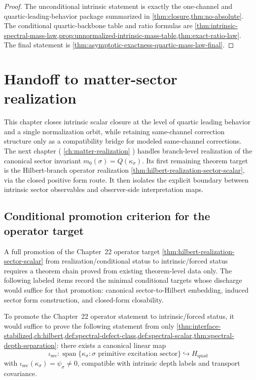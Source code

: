 \begin{proof}
The unconditional intrinsic statement is exactly the one-channel and
quartic-leading-behavior package summarized in
\cref{thm:closure,thm:no-absolute}.
The conditional quartic-backbone table and ratio formulas are
\cref{thm:intrinsic-spectral-mass-law,prop:unnormalized-intrinsic-mass-table,thm:exact-ratio-law}.
The final statement is
\cref{thm:asymptotic-exactness-quartic-mass-law-final}.
\end{proof}

\section{Handoff to matter-sector realization}
\label{sec:shell-handoff}

This chapter closes intrinsic scalar closure at the level of quartic
leading behavior and a single normalization orbit, while retaining
same-channel correction structure only as a compatibility bridge for
modeled same-channel corrections.
The next chapter (
\cref{ch:matter-realization}
) handles branch-level realization of the canonical sector invariant
\(m_0(\sigma)=Q(\kappa_\sigma)\).
Its first remaining theorem target is the Hilbert-branch operator
realization
\cref{thm:hilbert-realization-sector-scalar}, via the closed positive
form route.
It then isolates the explicit boundary between intrinsic sector observables
and observer-side interpretation maps.


\subsection{Conditional promotion criterion for the operator target}
\label{subsec:shell-operator-promotion}

A full promotion of the Chapter~22 operator target
\cref{thm:hilbert-realization-sector-scalar}
from realization/conditional status to intrinsic/forced status requires a
theorem chain proved from existing theorem-level data only.
The following labeled items record the minimal conditional targets whose
discharge would suffice for that promotion: canonical sector-to-Hilbert
embedding, induced sector form construction, and closed-form closability.

\begin{theorem}
\label{thm:conditional-sector-to-hilbert-embedding}
To promote the Chapter~22 operator statement to intrinsic/forced status,
it would suffice to prove the following statement from only
\cref{thm:interface-stabilized,ch:hilbert,def:spectral-defect-class,def:spectral-scalar,thm:spectral-depth-separation}:
there exists a canonical linear map
\[
  \iota_{\mathrm{sec}}:
  \operatorname{span}\{\kappa_\sigma:\sigma\text{ primitive excitation sector}\}
  \hookrightarrow
  H_{\mathrm{quad}}
\]
with
\(\iota_{\mathrm{sec}}(\kappa_\sigma)=\psi_\sigma\neq0\),
compatible with intrinsic depth labels and transport covariance.
\end{theorem}

